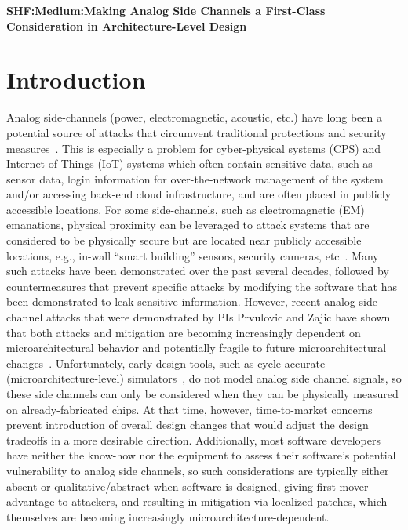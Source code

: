 \documentclass[11 pt]{article}
\begin{document}
\begin{center}
{\Large \textbf{SHF:Medium:Making Analog Side Channels a First-Class Consideration in Architecture-Level Design}}
\end{center}

\section{Introduction}
Analog side-channels (power, electromagnetic, acoustic, etc.) have long been a potential source of attacks that circumvent traditional protections and security measures~\cite{217605,Backes:2010:ASA:1929820.1929847,Balasch2015DPABA,10.1007/978-3-319-66787-4_27,4812164,Chari:2002:TA:648255.752740,Genkin:2016:EKE:2976749.2978353}. This is especially a problem for cyber-physical systems (CPS) and Internet-of-Things (IoT) systems which often contain sensitive data, such as sensor data, login information for over-the-network management of the system and/or accessing back-end cloud infrastructure, and are often placed in publicly accessible  locations. For some side-channels, such as electromagnetic (EM) emanations, physical proximity can be leveraged to attack systems that are considered to be physically secure but are located near publicly accessible locations, e.g., in-wall ``smart building'' sensors, security cameras, etc~\cite{10.1007/978-3-662-48324-4_11,6766222,Camurati:2018:SCE:3243734.3243802,8574570}.
Many such attacks have been demonstrated over the past several decades, followed by countermeasures that prevent specific attacks by modifying the software that has been demonstrated to leak sensitive information. However, recent analog side channel attacks that were demonstrated by PIs Prvulovic and Zajic have shown that both attacks and mitigation are becoming increasingly dependent on microarchitectural behavior and potentially fragile to future microarchitectural changes~\cite{217605,Monjur21}.
Unfortunately, early-design tools, such as cycle-accurate (microarchitecture-level) simulators~\cite{Li:2009:MIP:1669112.1669172,Li:2011:CAM:2132325.2132479,509850,Ardestani:2013:EFM:2495252.2495480,Binkert:2011:GS:2024716.2024718,sesc,5982026,carlson2014aeohmcm}, do not model analog side channel signals, so these side channels can only be considered when they can be physically measured on already-fabricated chips. At that time, however, time-to-market concerns prevent introduction of overall design changes that would adjust the design tradeoffs in a more desirable direction. Additionally, most software developers have neither the know-how nor the equipment to assess their software’s potential vulnerability to analog side channels, so such considerations are typically either absent or qualitative/abstract when software is designed, giving first-mover advantage to attackers, and resulting in mitigation via localized patches, which themselves are becoming increasingly microarchitecture-dependent.
\end{document}
